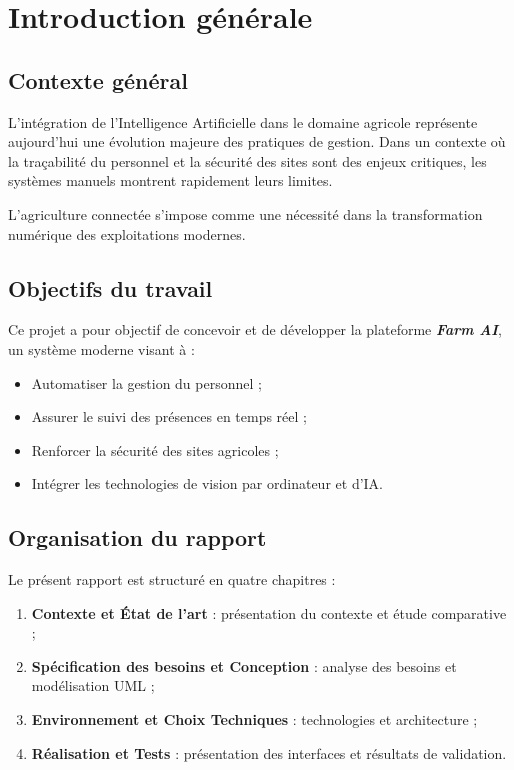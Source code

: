 \documentclass[12pt,a4paper]{report}
\numberwithin{figure}{chapter}
\numberwithin{table}{chapter}
\begin{document}
\chapter*{Introduction générale}

\section*{Contexte général}
L'intégration de l'Intelligence Artificielle dans le domaine agricole représente aujourd'hui une
évolution majeure des pratiques de gestion. Dans un contexte où la traçabilité du personnel et la
sécurité des sites sont des enjeux critiques, les systèmes manuels montrent rapidement leurs limites.

\begin{infobox}
  L'agriculture connectée s'impose comme une nécessité dans la transformation numérique
  des exploitations modernes.
\end{infobox}

\section*{Objectifs du travail}
Ce projet a pour objectif de concevoir et de développer la plateforme \textbf{\textit{Farm AI}}, un
système moderne visant à :

\begin{itemize}
  \item Automatiser la gestion du personnel ;
  \item Assurer le suivi des présences en temps réel ;
  \item Renforcer la sécurité des sites agricoles ;
  \item Intégrer les technologies de vision par ordinateur et d'IA.
\end{itemize}

\section*{Organisation du rapport}
Le présent rapport est structuré en quatre chapitres :

\begin{enumerate}
  \item \textbf{Contexte et État de l'art} : présentation du contexte et étude comparative ;
  \item \textbf{Spécification des besoins et Conception} : analyse des besoins et modélisation UML ;
  \item \textbf{Environnement et Choix Techniques} : technologies et architecture ;
  \item \textbf{Réalisation et Tests} : présentation des interfaces et résultats de validation.
\end{enumerate}
\end{document}
